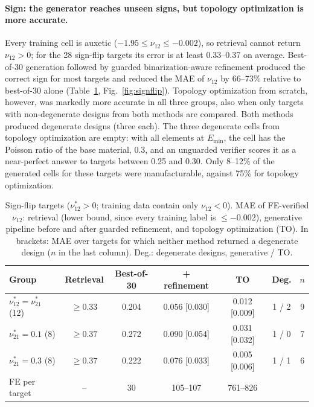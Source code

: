 \documentclass[a4paper,11pt]{article}
\newcommand{\nuot}{\nu_{12}}
\newcommand{\nuto}{\nu_{21}}
\begin{document}
\paragraph{Sign: the generator reaches unseen signs, but topology
optimization is more accurate.}
Every training cell is auxetic ($-1.95\le\nuot\le-0.002$), so retrieval
cannot return $\nuot>0$; for the 28 sign-flip targets its error is at least
0.33--0.37 on average. Best-of-30 generation followed by guarded
binarization-aware refinement produced the correct sign for most targets
and reduced the MAE of $\nuot$ by 66--73\% relative to best-of-30 alone
(Table~\ref{tab:signflip}, Fig.~\ref{fig:signflip}). Topology optimization
from scratch, however, was markedly more accurate in all three groups, also
when only targets with non-degenerate designs from both methods are
compared. Both methods produced degenerate designs (three each). The three
degenerate cells from topology optimization are empty: with all elements at
$E_{\min}$, the cell has the Poisson ratio of the base material, 0.3, and an
unguarded verifier scores it as a near-perfect answer to targets between 0.25
and 0.30. Only 8--12\% of the generated cells for these targets were
manufacturable, against 75\% for topology optimization.

\begin{table}[t]
\centering
\caption{Sign-flip targets ($\nuot^{*}>0$; training data contain only
$\nuot<0$). MAE of FE-verified $\nuot$: retrieval (lower bound, since every
training label is $\le-0.002$), generative pipeline before and after
guarded refinement, and topology optimization (TO). In brackets: MAE over
targets for which neither method returned a degenerate design ($n$ in the
last column). Deg.: degenerate designs, generative / TO.}
\label{tab:signflip}
\small
\setlength{\tabcolsep}{3.5pt}
\begin{tabular}{lcccccc}
\toprule
Group & Retrieval & Best-of-30 & + refinement & TO & Deg. & $n$\\
\midrule
$\nuot^{*}=\nuto^{*}$ (12)  & $\ge0.33$ & 0.204 & 0.056 [0.030] & 0.012 [0.009] & 1 / 2 & 9\\
$\nuto^{*}=0.1$ (8)          & $\ge0.37$ & 0.272 & 0.090 [0.054] & 0.031 [0.032] & 1 / 0 & 7\\
$\nuto^{*}=0.3$ (8)          & $\ge0.37$ & 0.222 & 0.076 [0.033] & 0.005 [0.006] & 1 / 1 & 6\\
\midrule
FE per target & -- & 30 & 105--107 & 761--826 & & \\
\bottomrule
\end{tabular}
\end{table}
\end{document}
